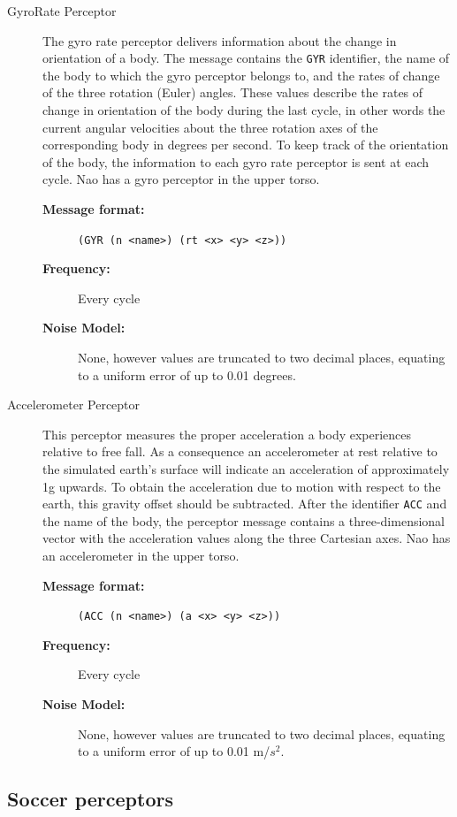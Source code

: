 \begin{description}
  \item [GyroRate Perceptor]
  The gyro rate perceptor delivers information about the change in orientation of a body. The message contains the \texttt{GYR} identifier, the name of the body to which the gyro perceptor belongs to, and the rates of change of the three rotation (Euler) angles. These values describe the rates of change in orientation of the body during the last cycle, in other words the current angular velocities about the three rotation axes of the corresponding body in degrees per second. To keep track of the orientation of the body, the information to each gyro rate perceptor is sent at each cycle. Nao has a gyro perceptor in the upper torso.
  \begin{description}
  \item[{\bf Message format:}]
  \texttt{(GYR (n <name>) (rt <x> <y> <z>))}
  \item[{\bf Frequency:}]
  Every cycle
  \item[{\bf Noise Model:}]None, however values are truncated to two decimal places, equating to a uniform error of up to 0.01 degrees.
  \end{description}

  \item [Accelerometer Perceptor]
  This perceptor measures the proper acceleration a body experiences relative to free fall. As a consequence an accelerometer at rest relative to the simulated earth's surface will indicate an acceleration of approximately 1g upwards. To obtain the acceleration due to motion with respect to the earth, this gravity offset should be subtracted. After the identifier \texttt{ACC} and the name of the body, the perceptor message contains a three-dimensional vector with the acceleration values along the three Cartesian axes. Nao has an accelerometer in the upper torso.
    \begin{description}
  \item[{\bf Message format:}]
  \texttt{(ACC (n <name>) (a <x> <y> <z>))}
  \item[{\bf Frequency:}]
  Every cycle
  \item[{\bf Noise Model:}]None, however values are truncated to two decimal places, equating to a uniform error of up to 0.01 m/$s^{2}$.
  \end{description}
\end{description}

\subsection{Soccer perceptors}

